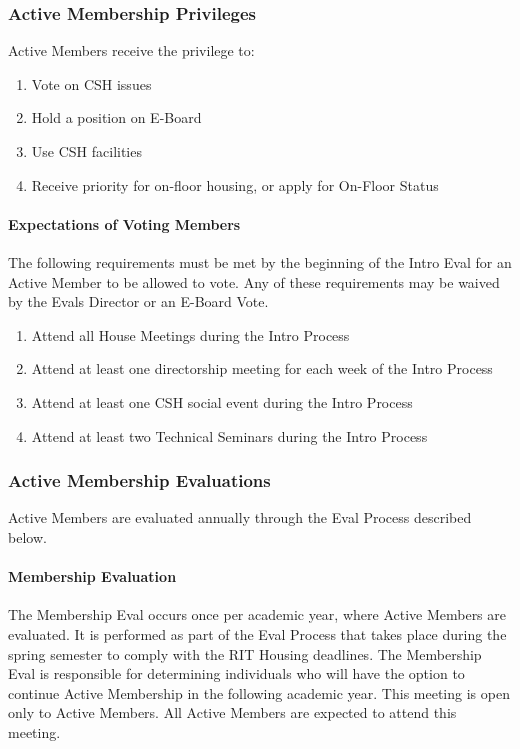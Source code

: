 \documentclass{article}
\newcommand{\asubsection}[1]{\subsubsection{#1} \label{#1}}
\newcommand{\asubsubsection}[1]{\paragraph{#1} \label{#1}}
\begin{document}
\asubsection{Active Membership Privileges}
Active Members receive the privilege to:
\begin{enumerate}
	\item Vote on CSH issues
	\item Hold a position on E-Board
	\item Use CSH facilities
	\item Receive priority for on-floor housing, or apply for On-Floor Status
\end{enumerate}

\asubsubsection{Expectations of Voting Members}
\renewcommand{\theenumi}{\arabic{enumi}} %

The following requirements must be met by the beginning of the Intro Eval for an Active Member to be allowed to vote.
Any of these requirements may be waived by the Evals Director or an E-Board Vote.
\begin{enumerate}
	\item Attend all House Meetings during the Intro Process
	\item Attend at least one directorship meeting for each week of the Intro Process %
	\item Attend at least one CSH social event during the Intro Process
	\item Attend at least two Technical Seminars during the Intro Process
\end{enumerate}

\asubsection{Active Membership Evaluations}
Active Members are evaluated annually through the Eval Process described below.

\asubsubsection{Membership Evaluation}
The Membership Eval occurs once per academic year, where Active Members are evaluated.
It is performed as part of the Eval Process that takes place during the spring semester to comply with the RIT Housing deadlines.
The Membership Eval is responsible for determining individuals who will have the option to continue Active Membership in the following academic year.
This meeting is open only to Active Members.
All Active Members are expected to attend this meeting.
\end{document}
